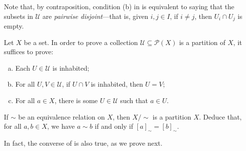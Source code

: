 Note that, by contraposition, condition (b) in  is equivalent to saying that the subsets in $\mathcal{U}$ are \textit{pairwise disjoint}---that is, given $i,j \in I$, if $i \ne j$, then $U_i \cap U_j$ is empty.

\begin{strategy}
Let $X$ be a set. In order to prove a collection $\mathcal{U} \subseteq \mathcal{P}(X)$ is a partition of $X$, it suffices to prove:
\begin{enumerate}[(a)]
\item Each $U \in \mathcal{U}$ is inhabited;
\item For all $U, V \in \mathcal{U}$, if $U \cap V$ is inhabited, then $U=V$;
\item For all $a \in X$, there is some $U \in \mathcal{U}$ such that $a \in U$.
\end{enumerate}
\end{strategy}

\begin{exercise}
\label{exQuotientIsPartition}
If $\sim$ be an equivalence relation on $X$, then $X/{\sim}$ is a partition $X$. Deduce that, for all $a,b \in X$, we have $a \sim b$ if and only if $[a]_{\sim} = [b]_{\sim}$.
\end{exercise}

In fact, the converse of  is also true, as we prove next.

